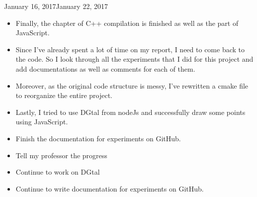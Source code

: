 \begin{fichesuivi}{January 16, 2017}{January 22, 2017}

   \begin{travaileffectue}
        \begin{itemize}
            \item Finally, the chapter of C++ compilation is finished as well as the part of JavaScript.
            \item Since I've already spent a lot of time on my report, I need to come back to the code.
So I look through all the experiments that I did for this project and add documentations as
well as comments for each of them.
            \item Moreover, as the original code structure is messy, I've
rewritten a cmake file to reorganize the entire project.
            \item Lastly, I tried to use DGtal from nodeJs and successfully draw some points using JavaScript.
        \end{itemize}
   \end{travaileffectue}

   \begin{travailnoneffectue}
        \begin{itemize}
             \item Finish the documentation for experiments on GitHub.
        \end{itemize}
   \end{travailnoneffectue}

 
   \begin{planification}
        \begin{itemize}
            \item Tell my professor the progress
            \item Continue to work on DGtal
            \item Continue to write documentation for experiments on GitHub.
        \end{itemize}
   \end{planification}
\end{fichesuivi}







